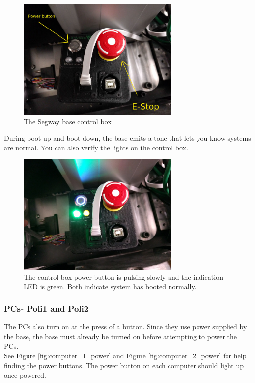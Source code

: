 \begin{figure}[h]
  \centering
  \includegraphics[width=300px]{figures/base_power.jpg}
  \caption{The Segway base control box}
  \label{fig:base_powerbox}
\end{figure}

During boot up and boot down, the base emits a tone that lets you know systems are normal. You can also verify the lights on the control box. 

\begin{figure}[h] 
  \centering
  \includegraphics[width=300px]{figures/base_power_on.jpg}
  \caption{The control box power button is pulsing slowly and the indication LED is green. Both indicate system has booted normally.}
  \label{fig:base_powerbox_on}
\end{figure}

\subsubsection{PCs- Poli1 and Poli2}
The PCs also turn on at the press of a button. Since they use power supplied by the base, the base must already be turned on before attempting to power the PCs.\\

See Figure \ref{fig:computer_1_power} and Figure \ref{fig:computer_2_power} for help finding the power buttons. The power button on each computer should light up once powered.

